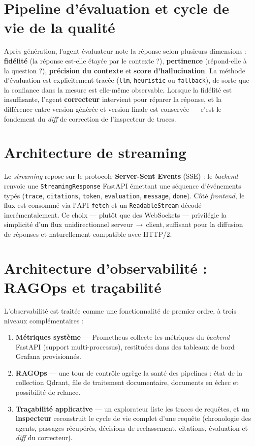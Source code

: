 \documentclass[12pt,a4paper,oneside]{report}
\newcommand{\code}[1]{\texttt{\small #1}}
\begin{document}
\section{Pipeline d'évaluation et cycle de vie de la qualité}
Après génération, l'agent évaluateur note la réponse selon plusieurs dimensions :
\textbf{fidélité} (la réponse est-elle étayée par le contexte ?),
\textbf{pertinence} (répond-elle à la question ?), \textbf{précision du contexte}
et \textbf{score d'hallucination}. La méthode d'évaluation est explicitement
tracée (\code{llm}, \code{heuristic} ou \code{fallback}), de sorte que la
confiance dans la mesure est elle-même observable. Lorsque la fidélité est
insuffisante, l'agent \textbf{correcteur} intervient pour réparer la réponse, et
la différence entre version générée et version finale est conservée — c'est le
fondement du \emph{diff} de correction de l'inspecteur de traces.

\section{Architecture de streaming}
Le \emph{streaming} repose sur le protocole \textbf{Server-Sent Events} (SSE) :
le \textit{backend} renvoie une \code{StreamingResponse} FastAPI émettant une
séquence d'événements typés (\code{trace}, \code{citations}, \code{token},
\code{evaluation}, \code{message}, \code{done}). Côté \textit{frontend}, le flux
est consommé via l'API \code{fetch} et un \code{ReadableStream} décodé
incrémentalement. Ce choix — plutôt que des WebSockets — privilégie la simplicité
d'un flux unidirectionnel serveur\,$\rightarrow$\,client, suffisant pour la
diffusion de réponses et naturellement compatible avec HTTP/2.

\section{Architecture d'observabilité : RAGOps et traçabilité}
L'observabilité est traitée comme une fonctionnalité de premier ordre, à trois
niveaux complémentaires :
\begin{enumerate}[leftmargin=*]
  \item \textbf{Métriques système} — Prometheus collecte les métriques du
  \textit{backend} FastAPI (support multi-processus), restituées dans des tableaux
  de bord Grafana provisionnés.
  \item \textbf{RAGOps} — une tour de contrôle agrège la santé des pipelines :
  état de la collection Qdrant, file de traitement documentaire, documents en
  échec et possibilité de relance.
  \item \textbf{Traçabilité applicative} — un explorateur liste les traces de
  requêtes, et un \textbf{inspecteur} reconstruit le cycle de vie complet d'une
  requête (chronologie des agents, passages récupérés, décisions de reclassement,
  citations, évaluation et \emph{diff} du correcteur).
\end{enumerate}
\end{document}
